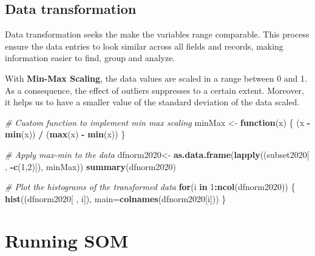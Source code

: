 \documentclass[
]{book}
\newenvironment{Shaded}{\begin{snugshade}}{\end{snugshade}}
\newcommand{\AttributeTok}[1]{\textcolor[rgb]{0.13,0.29,0.53}{#1}}
\newcommand{\CommentTok}[1]{\textcolor[rgb]{0.56,0.35,0.01}{\textit{#1}}}
\newcommand{\ControlFlowTok}[1]{\textcolor[rgb]{0.13,0.29,0.53}{\textbf{#1}}}
\newcommand{\DecValTok}[1]{\textcolor[rgb]{0.00,0.00,0.81}{#1}}
\newcommand{\FunctionTok}[1]{\textcolor[rgb]{0.13,0.29,0.53}{\textbf{#1}}}
\newcommand{\NormalTok}[1]{#1}
\newcommand{\OtherTok}[1]{\textcolor[rgb]{0.56,0.35,0.01}{#1}}
\newcommand{\SpecialCharTok}[1]{\textcolor[rgb]{0.81,0.36,0.00}{\textbf{#1}}}
\begin{document}
\hypertarget{data-transformation}{%
\subsection{Data transformation}\label{data-transformation}}

Data transformation seeks the make the variables range comparable.
This process ensure the data entries to look similar across all fields and records, making information easier to find, group and analyze.

With \textbf{Min-Max Scaling}, the data values are scaled in a range between 0 and 1.
As a consequence, the effect of outliers suppresses to a certain extent.
Moreover, it helps us to have a smaller value of the standard deviation of the data scaled.

\begin{Shaded}
\begin{Highlighting}[]
\CommentTok{\# Custom function to implement min max scaling}
\NormalTok{minMax }\OtherTok{\textless{}{-}} \ControlFlowTok{function}\NormalTok{(x) \{}
\NormalTok{  (x }\SpecialCharTok{{-}} \FunctionTok{min}\NormalTok{(x)) }\SpecialCharTok{/}\NormalTok{ (}\FunctionTok{max}\NormalTok{(x) }\SpecialCharTok{{-}} \FunctionTok{min}\NormalTok{(x))}
\NormalTok{\}}

\CommentTok{\# Apply max{-}min to the data}
\NormalTok{dfnorm2020}\OtherTok{\textless{}{-}} \FunctionTok{as.data.frame}\NormalTok{(}\FunctionTok{lapply}\NormalTok{((subset2020[ , }\SpecialCharTok{{-}}\FunctionTok{c}\NormalTok{(}\DecValTok{1}\NormalTok{,}\DecValTok{2}\NormalTok{)]), minMax))}
\FunctionTok{summary}\NormalTok{(dfnorm2020)}
\end{Highlighting}
\end{Shaded}

\begin{Shaded}
\begin{Highlighting}[]
\CommentTok{\# Plot the histograms of the transformed data }
\ControlFlowTok{for}\NormalTok{(i }\ControlFlowTok{in} \DecValTok{1}\SpecialCharTok{:}\FunctionTok{ncol}\NormalTok{(dfnorm2020)) \{      }
    \FunctionTok{hist}\NormalTok{((dfnorm2020[ , i]),  }\AttributeTok{main=}\FunctionTok{colnames}\NormalTok{(dfnorm2020[i]))}
\NormalTok{\}}
\end{Highlighting}
\end{Shaded}

\hypertarget{running-som}{%
\section{Running SOM}\label{running-som}}
\end{document}
